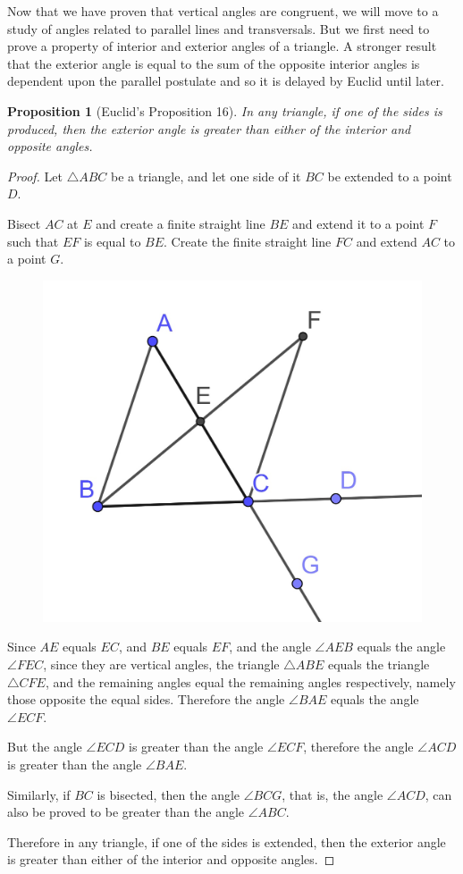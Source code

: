 \documentclass[
]{book}
\newtheorem{proposition}{Proposition}[chapter]
\theoremstyle{definition}
\theoremstyle{definition}
\theoremstyle{definition}
\theoremstyle{definition}
\theoremstyle{remark}
\begin{document}
Now that we have proven that vertical angles are congruent, we will move to a study of angles related to parallel lines and transversals. But we first need to prove a property of interior and exterior angles of a triangle. A stronger result that the exterior angle is equal to the sum of the opposite interior angles is dependent upon the parallel postulate and so it is delayed by Euclid until later.

\begin{proposition}[Euclid's Proposition 16]
\protect\hypertarget{prp:prop16}{}\label{prp:prop16}In any triangle, if one of the sides is produced, then the exterior angle is greater than either of the interior and opposite angles.
\end{proposition}

\begin{proof}
Let \(\triangle ABC\) be a triangle, and let one side of it \(BC\) be extended to a point \(D\).

Bisect \(AC\) at \(E\) and create a finite straight line \(BE\) and extend it to a point \(F\) such that \(EF\) is equal to \(BE\). Create the finite straight line \(FC\) and extend \(AC\) to a point \(G\).

\begin{figure}

{\centering \includegraphics[width=0.3\linewidth]{images/Prop16} 

}

\end{figure}

Since \(AE\) equals \(EC\), and \(BE\) equals \(EF\), and the angle \(\angle AEB\) equals the angle \(\angle FEC\), since they are vertical angles, the triangle \(\triangle ABE\) equals the triangle \(\triangle CFE\), and the remaining angles equal the remaining angles respectively, namely those opposite the equal sides. Therefore the angle \(\angle BAE\) equals the angle \(\angle ECF\).

But the angle \(\angle ECD\) is greater than the angle \(\angle ECF\), therefore the angle \(\angle ACD\) is greater than the angle \(\angle BAE\).

Similarly, if \(BC\) is bisected, then the angle \(\angle BCG\), that is, the angle \(\angle ACD\), can also be proved to be greater than the angle \(\angle ABC\).

Therefore in any triangle, if one of the sides is extended, then the exterior angle is greater than either of the interior and opposite angles.
\end{proof}
\end{document}
